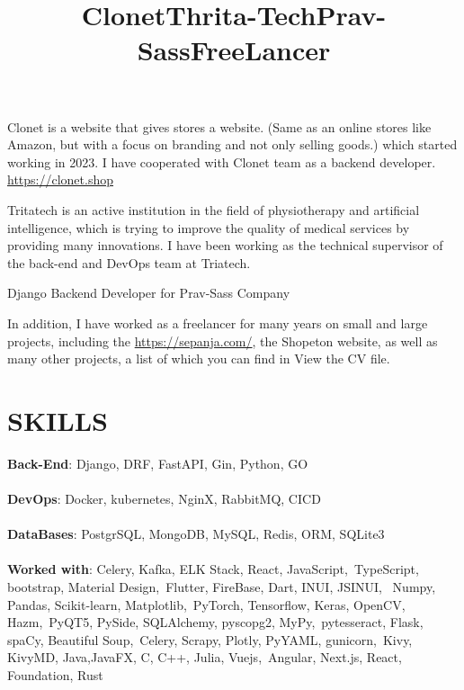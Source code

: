 \documentclass[margin]{res}
\begin{document}
\begin{resume}
\title{\textbf{Clonet}}
\begin{position}
    Clonet is a website that gives stores a website. (Same as an online stores like Amazon, but with a focus on branding and not only selling goods.) which started working in 2023. I have cooperated with Clonet team as a backend developer.
    \\
    \url{https://clonet.shop}
\end{position}


\title{\textbf{Thrita-Tech}}
\begin{position}
Tritatech is an active institution in the field of physiotherapy and artificial intelligence, which is trying to improve the quality of medical services by providing many innovations. I have been working as the technical supervisor of the back-end and DevOps team at Triatech.
\end{position}

\title{\textbf{Prav-Sass}}
\begin{position}
Django Backend Developer for Prav-Sass Company
\end{position}


\employer{}
\title{\textbf{FreeLancer}}
\begin{position}
    In addition, I have worked as a freelancer for many years on small and large projects, including the \url{https://sepanja.com/}, the Shopeton website, as well as many other projects, a list of which you can find in View the CV file.
\end{position}


\section{SKILLS}


\textbf{Back-End}: Django, DRF, FastAPI, Gin, Python, GO
\\
\\
\textbf{DevOps}: Docker, kubernetes, NginX, RabbitMQ, CICD
\\
\\
\textbf{DataBases}: PostgrSQL, MongoDB, MySQL, Redis, ORM, SQLite3
\\
\\
\textbf{Worked with}: Celery, Kafka, ELK Stack, React, JavaScript,\
                    TypeScript, bootstrap, Material Design,\
                    Flutter, FireBase, Dart, INUI, JSINUI, \
                    Numpy, Pandas, Scikit-learn, Matplotlib,\
                    PyTorch, Tensorflow, Keras, OpenCV, Hazm,\
                    PyQT5, PySide, SQLAlchemy, pyscopg2, MyPy,\ 
                    pytesseract, Flask, spaCy, Beautiful Soup,\
                    Celery, Scrapy, Plotly, PyYAML, gunicorn,\ 
                    Kivy, KivyMD, Java,JavaFX, C, C++, Julia, Vuejs,\
                    Angular, Next.js, React, Foundation, Rust
\\
\\


\end{resume}
\end{document}
